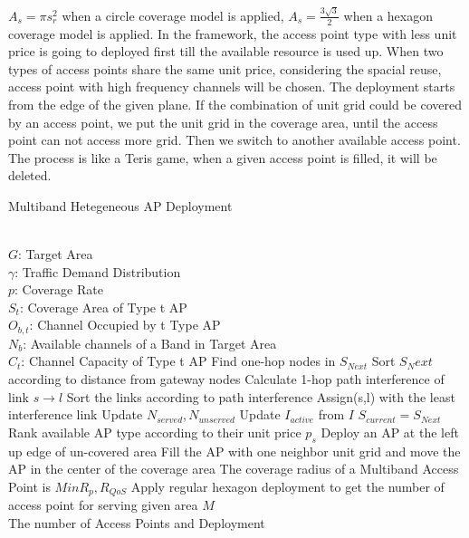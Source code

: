 $A_s=\pi s_r^2$ when a circle coverage model is applied, $A_s = \frac{3\sqrt{3}}{2}$ when a 
hexagon coverage model is applied. In the framework, the access point type with less unit price 
is going to deployed first till the available resource is used up. When two types of access points
share the same unit price, considering the spacial reuse, access point with high frequency channels
will be chosen. The deployment starts from the edge of the given plane. If the combination of unit 
grid could be covered by an access point, we put the unit grid in the coverage area, until the access
point can not access more grid. Then we switch to another available access point. The process is like
a Teris game, when a given access point is filled, it will be deleted.
\begin{algorithm}
\caption{Multiband Hetegeneous AP Deployment}
\label{alg:gls}
\begin{algorithmic}[1]
\REQUIRE  ~~\\
$G$: Target Area \\
$\gamma$: Traffic Demand Distribution\\
$p$: Coverage Rate\\
$S_t$: Coverage Area of Type t AP \\
$O_{b,t}$: Channel Occupied by t Type AP\\
$N_b$: Available channels of a Band in Target Area\\
$C_t$: Channel Capacity of Type t AP
	\STATE Find one-hop nodes in $S_{Next}$
	\STATE Sort $S_Next$ according to distance from gateway nodes
		\STATE Calculate 1-hop path interference of link $s\rightarrow l$
		\STATE Sort the links according to path interference
		\STATE Assign(s,l) with the least interference link
		\STATE Update $N_{served},N_{unserved}$
		\STATE Update $I_{active}$ from $I$
	\ENDFOR
	\STATE $S_{current}=S_{Next}$
\ENDFOR
\ENDWHILE
\STATE Rank available AP type according to their unit price $p_s$
\STATE Deploy an AP at the left up edge of un-covered area
\STATE Fill the AP with one neighbor unit grid and move the AP in the center of the coverage area
\STATE 
\STATE The coverage radius of a Multiband Access Point is $Min{R_p,R_{QoS}}$
\STATE Apply regular hexagon deployment to get the number of access point for serving given area $M$
\ENSURE ~~\\
The number of Access Points and Deployment\\
\end{algorithmic}
\end{algorithm}

